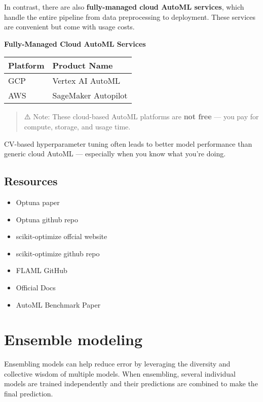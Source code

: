 \documentclass[
  letterpaper,
  DIV=11,
  numbers=noendperiod]{scrreprt}
\begin{document}
In contrast, there are also \textbf{fully-managed cloud AutoML
services}, which handle the entire pipeline from data preprocessing to
deployment. These services are convenient but come with usage costs.

\textbf{Fully-Managed Cloud AutoML Services}

\begin{longtable}[]{@{}ll@{}}
\toprule\noalign{}
\textbf{Platform} & \textbf{Product Name} \\
\midrule\noalign{}
\endhead
\bottomrule\noalign{}
\endlastfoot
GCP & Vertex AI AutoML \\
AWS & SageMaker Autopilot \\
\end{longtable}

\begin{quote}
⚠️ Note: These cloud-based AutoML platforms are \textbf{not free} ---
you pay for compute, storage, and usage time.
\end{quote}

CV-based hyperparameter tuning often leads to better model performance
than generic cloud AutoML --- especially when you know what you're
doing.

\section{Resources}\label{resources}

\begin{itemize}
\item
  Optuna paper
\item
  Optuna github repo
\item
  scikit-optimize offcial website
\item
  scikit-optimize github repo
\item
  FLAML GitHub
\item
  Official Docs
\item
  AutoML Benchmark Paper
\end{itemize}

\chapter{Ensemble modeling}\label{ensemble-modeling}

Ensembling models can help reduce error by leveraging the diversity and
collective wisdom of multiple models. When ensembling, several
individual models are trained independently and their predictions are
combined to make the final prediction.
\end{document}
